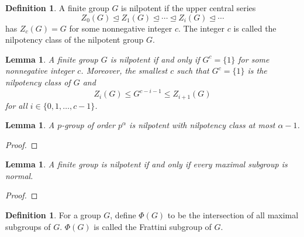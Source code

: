 \documentclass{dcthesis}
\newcommand{\defi}[1]{\textsf{#1}}
\newtheorem{lemma}[prop]{Lemma}
\theoremstyle{definition}
\newtheorem{definition}[prop]{Definition}
\theoremstyle{remark}
\numberwithin{equation}{section}
\numberwithin{figure}{section}
\begin{document}
{{    \begin{definition}
      \label{def:nilpotentgroup}
      A finite group $G$ is \defi{nilpotent}
      if the upper central series
      \[
        Z_0(G)\trianglelefteq Z_1(G)\trianglelefteq\cdots\trianglelefteq Z_{i}(G)\trianglelefteq\cdots
      \]
      has $Z_c(G) = G$ for some nonnegative integer $c$.
      The integer $c$ is called the \defi{nilpotency class} of
      the nilpotent group $G$.
    \end{definition}
    \begin{lemma}
      \label{lem:upperlowernilpotent}
      A finite group $G$ is nilpotent if and only if
      $G^c=\{1\}$ for some nonnegative integer $c$.
      Moreover,
      the smallest $c$ such that $G^c=\{1\}$
      is the nilpotency class of $G$ and
      \[
        Z_i(G)\leq G^{c-i-1}\leq Z_{i+1}(G)
      \]
      for all $i\in \{0,1,\dots,c-1\}$.
    \end{lemma}
    \begin{lemma}
      A $p$-group of order $p^\alpha$ is nilpotent with nilpotency class
      at most $\alpha-1$.
    \end{lemma}
    \begin{proof}
    \end{proof}
    \begin{lemma}
      A finite group is nilpotent if and only if
      every maximal subgroup is normal.
    \end{lemma}
    \begin{proof}
    \end{proof}
    \begin{definition}
      \label{def:frattinisubgroup}
      For a group $G$,
      define $\Phi(G)$
      to be the intersection of all maximal subgroups of $G$.
      $\Phi(G)$ is called the
      \defi{Frattini subgroup of $G$}.
    \end{definition}
  }
}
\end{document}
